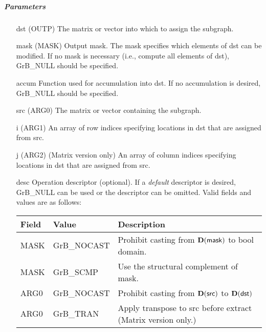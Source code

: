 \subparagraph{Parameters}

\begin{itemize}[leftmargin=1.1in]
    \item[{\sf dst}]   ({\sf OUTP}) The matrix or vector into which to assign the subgraph.

    \item[{\sf mask}] ({\sf MASK}) Output mask. The mask specifies which elements
    of {\sf dst} can be modified. If no mask is necessary (i.e., compute all
    elements of {\sf dst}), {\sf GrB\_NULL} should be specified.

    \item[{\sf accum}] Function used for accumulation into {\sf dst}.  If no accumulation
                        is desired, {\sf GrB\_NULL} should be specified.

    \item[{\sf src}]   ({\sf ARG0}) The matrix or vector containing the subgraph.
    \item[{\sf i}]     ({\sf ARG1}) An array of row indices specifying locations in dst that
                       are assigned from src.
    \item[{\sf j}]     ({\sf ARG2}) (Matrix version only) An array of column indices 
                       specifying locations in dst that are assigned from src.


    \item[{\sf desc}]   Operation descriptor (optional). If a
    \emph{default} descriptor is desired, {\sf GrB\_NULL} can be
    used or the descriptor can be omitted.  Valid fields and values are as follows: \\
    \begin{tabular}{lll}
    Field  & Value & Description \\
    \hline
    {\sf MASK} & {\sf GrB\_NOCAST} & Prohibit casting from $\bold{D}({\sf mask})$ to {\sf bool} domain. \\
    {\sf MASK} & {\sf GrB\_SCMP} & Use the structural complement of {\sf mask}. \\
    {\sf ARG0} & {\sf GrB\_NOCAST} & Prohibit casting from $\bold{D}({\sf src})$ to $\bold{D}({\sf dst})$ \\
    {\sf ARG0} & {\sf GrB\_TRAN} & Apply transpose to {\sf src} before extract (Matrix version only.) \\
    \end{tabular}

\end{itemize}

